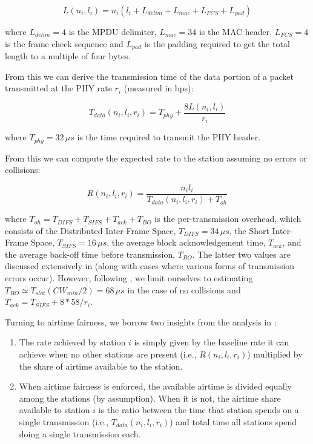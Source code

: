 \documentclass[english]{scrartcl}
\begin{document}
\begin{equation}
L(n_i,l_i) = n_i(l_i+L_{delim}+L_{mac}+L_{FCS}+L_{pad})
\end{equation}

where \(L_{delim}=4\) is the MPDU delimiter, \(L_{mac}=34\) is the MAC header,
\(L_{FCS}=4\) is the frame check sequence and \(L_{pad}\) is the padding required to
get the total length to a multiple of four bytes.

From this we can derive the transmission time of the data portion of a packet
transmitted at the PHY rate \(r_i\) (measured in bps):

\begin{equation}
T_{data}(n_i,l_i,r_i) = T_{phy}+\frac{8L(n_i,l_i)}{r_i}
\end{equation}

where \(T_{phy}=32\,\mu s\) is the time required to transmit the PHY header.

From this we can compute the expected rate to the station assuming no errors or
collisions:

\begin{equation}
R(n_i,l_i,r_i) = \frac{n_i l_i}{T_{data}(n_i,l_i,r_i)+T_{oh}}
\end{equation}

where \(T_{oh}=T_{DIFS}+T_{SIFS}+T_{ack}+T_{BO}\) is the per-transmission
overhead, which consists of the Distributed Inter-Frame Space, \(T_{DIFS}=34\,\mu
s\), the Short Inter-Frame Space, \(T_{SIFS}=16\,\mu s\), the average block
acknowledgement time, \(T_{ack}\), and the average back-off time before
transmission, \(T_{BO}\). The latter two values are discussed extensively in
\cite{arif_throughput_2014} (along with cases where various forms of transmission
errors occur). However, following \cite{kim_adaptive_2015}, we limit ourselves to
estimating \(T_{BO}\simeq T_{slot}(CW_{min}/2)=68\,\mu s\) in the case of no
collisions and \(T_{ack} = T_{SIFS} + 8*58 / r_i\).

Turning to airtime fairness, we borrow two insights from the analysis in
\cite{tan_time-based_2004}:

\begin{enumerate}
\item The rate achieved by station \(i\) is simply given by the baseline rate it can
achieve when no other stations are present (i.e., \(R(n_i,l_i,r_i)\))
multiplied by the share of airtime available to the station.

\item When airtime fairness is enforced, the available airtime is divided equally
among the stations (by assumption). When it is not, the airtime share
available to station \(i\) is the ratio between the time that station spends on
a single transmission (i.e., \(T_{data}(n_i,l_i,r_i)\)) and total time all
stations spend doing a single transmission each.
\end{enumerate}
\end{document}
